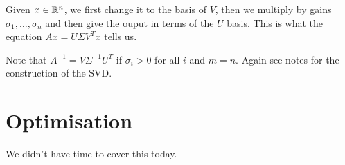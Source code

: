Given $x \in {\mathbb R}^n$, we first change it to the basis of $V$, then we multiply by gains $\sigma_1,\ldots, \sigma_n$ and then give the ouput in terms of the $U$ basis. This is what the equation $Ax = U\Sigma V^Tx$ tells us. 

Note that $A^{-1} = V \Sigma^{-1}U^T$ if $\sigma_i > 0$ for all $i$ and $m=n$. Again see notes for the construction of the SVD. 
\section{Optimisation}
We didn't have time to cover this today. 
 